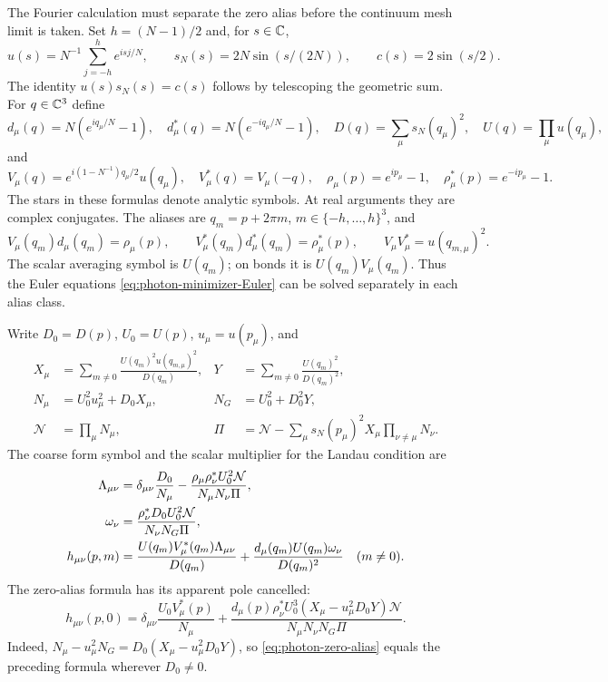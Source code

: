 The Fourier calculation must separate the zero alias before the
continuum mesh limit is taken. Set $h=(N-1)/2$ and, for $s\in\mathbb C$,
\[
 u(s)=N^{-1}\sum_{j=-h}^he^{isj/N},\qquad
 s_N(s)=2N\sin(s/(2N)),\qquad c(s)=2\sin(s/2).
\]
The identity $u(s)s_N(s)=c(s)$ follows by telescoping the geometric
sum. For $q\in\mathbb C^3$ define
\[
 d_\mu(q)=N(e^{iq_\mu/N}-1),\quad
 d_\mu^*(q)=N(e^{-iq_\mu/N}-1),\quad
 D(q)=\sum_\mu s_N(q_\mu)^2,\quad U(q)=\prod_\mu u(q_\mu),
\]
and
\[
 V_\mu(q)=e^{i(1-N^{-1})q_\mu/2}u(q_\mu),\quad
 V_\mu^*(q)=V_\mu(-q),\quad
 \rho_\mu(p)=e^{ip_\mu}-1,\quad\rho_\mu^*(p)=e^{-ip_\mu}-1.
\]
The stars in these formulas denote analytic symbols. At real arguments
they are complex conjugates. The aliases are $q_m=p+2\pi m$,
$m\in\{-h,\ldots,h\}^3$, and
\begin{equation}\label{eq:photon-alias-identities}
 V_\mu(q_m)d_\mu(q_m)=\rho_\mu(p),\qquad
 V_\mu^*(q_m)d_\mu^*(q_m)=\rho_\mu^*(p),\qquad
 V_\mu V_\mu^*=u(q_{m,\mu})^2.
\end{equation}
The scalar averaging symbol is $U(q_m)$; on bonds it is
$U(q_m)V_\mu(q_m)$. Thus the Euler equations
\eqref{eq:photon-minimizer-Euler} can be solved separately in each
alias class.

Write $D_0=D(p)$, $U_0=U(p)$, $u_\mu=u(p_\mu)$, and
\begin{align*}
 X_\mu&=\sum_{m\ne0}\frac{U(q_m)^2u(q_{m,\mu})^2}{D(q_m)},&
 Y&=\sum_{m\ne0}\frac{U(q_m)^2}{D(q_m)^2},\\
 N_\mu&=U_0^2u_\mu^2+D_0X_\mu,&
 N_G&=U_0^2+D_0^2Y,\\
 \mathcal N&=\prod_\mu N_\mu,&
 \Pi&=\mathcal N-\sum_\mu s_N(p_\mu)^2X_\mu
                                      \prod_{\nu\ne\mu}N_\nu.
\end{align*}
The coarse form symbol and the scalar multiplier for the Landau
condition are
\begin{align}
 \Lambda_{\mu\nu}
     &=\delta_{\mu\nu}\frac{D_0}{N_\mu}
       -\frac{\rho_\mu\rho_\nu^*U_0^2\mathcal N}
                    {N_\mu N_\nu\Pi},\notag\\
 \omega_\nu&=\frac{\rho_\nu^*D_0U_0^2\mathcal N}{N_\nu N_G\Pi},
                                                    \label{eq:photon-Lambda-symbol}\\
 h_{\mu\nu}(p,m)
    &=\frac{U(q_m)V_\mu^*(q_m)\Lambda_{\mu\nu}}{D(q_m)}
          +\frac{d_\mu(q_m)U(q_m)\omega_\nu}{D(q_m)^2}
                                      \quad(m\ne0).\notag
\end{align}
The zero-alias formula has its apparent pole cancelled:
\begin{equation}\label{eq:photon-zero-alias}
 h_{\mu\nu}(p,0)=\delta_{\mu\nu}\frac{U_0V_\mu^*(p)}{N_\mu}
       +\frac{d_\mu(p)\rho_\nu^*U_0^3
                 (X_\mu-u_\mu^2D_0Y)\mathcal N}
                  {N_\mu N_\nu N_G\Pi}.
\end{equation}
Indeed, $N_\mu-u_\mu^2N_G=D_0(X_\mu-u_\mu^2D_0Y)$, so
\eqref{eq:photon-zero-alias} equals the preceding formula wherever
$D_0\ne0$.

